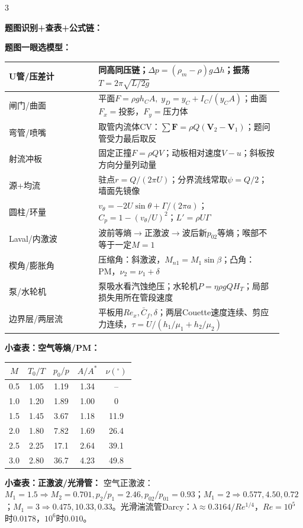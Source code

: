\documentclass[a4paper]{article}
\newcommand{\sect}[1]{\par{\bfseries\color{Q}#1：}}
\begin{document}
\begin{multicols}{3}
{\sect{题图识别+查表+公式链}
\sect{题图一眼选模型}
\renewcommand{\arraystretch}{0.67}\begin{tabular}{|p{0.30\linewidth}|p{0.62\linewidth}|}
\hline U管/压差计 & 同高同压链；$\Delta p=(\rho_m-\rho)g\Delta h$；振荡$T=2\pi\sqrt{L/2g}$\\ \hline
闸门/曲面 & 平面$F=\rho gh_CA,\;y_D=y_C+I_C/(y_CA)$；曲面$F_x=$投影，$F_y=$压力体\\ \hline
弯管/喷嘴 & 取管内流体CV：$\sum\bm F=\rho Q(\bm V_2-\bm V_1)$；题问管受力最后取反\\ \hline
射流冲板 & 固定正撞$F=\rho QV$；动板相对速度$V-u$；斜板按方向分量列动量\\ \hline
源+均流 & 驻点$r=Q/(2\pi U)$；分界流线常取$\psi=Q/2$；墙面先镜像\\ \hline
圆柱/环量 & $v_\theta=-2U\sin\theta+\Gamma/(2\pi a)$；$C_p=1-(v_\theta/U)^2$；$L'=\rho U\Gamma$\\ \hline
Laval/内激波 & 波前等熵$\to$正激波$\to$波后新$p_{02}$等熵；喉部不等于一定$M=1$\\ \hline
楔角/膨胀角 & 压缩角：斜激波，$M_{n1}=M_1\sin\beta$；凸角：PM，$\nu_2=\nu_1+\delta$\\ \hline
泵/水轮机 & 泵吸水看汽蚀绝压；水轮机$P=\eta\rho gQH_T$；局部损失用所在管段速度\\ \hline
边界层/两层流 & 平板用$Re_x,\bar C_f,\delta$；两层Couette速度连续、剪应力连续，$\tau=U/(h_1/\mu_1+h_2/\mu_2)$\\ \hline
\end{tabular}\renewcommand{\arraystretch}{1}

\sect{小查表：空气等熵/PM}
\renewcommand{\arraystretch}{0.66}\begin{tabular}{|c|c|c|c|c|}
\hline $M$&$T_0/T$&$p_0/p$&$A/A^*$&$\nu(^\circ)$\\ \hline
0.5&1.05&1.19&1.34&--\\ \hline
1.0&1.20&1.89&1.00&0\\ \hline
1.5&1.45&3.67&1.18&11.9\\ \hline
2.0&1.80&7.82&1.69&26.4\\ \hline
2.5&2.25&17.1&2.64&39.1\\ \hline
3.0&2.80&36.7&4.23&49.8\\ \hline
\end{tabular}\renewcommand{\arraystretch}{1}

\sect{小查表：正激波/光滑管}
空气正激波：$M_1=1.5\Rightarrow M_2=0.701,p_2/p_1=2.46,p_{02}/p_{01}=0.93$；$M_1=2\Rightarrow0.577,4.50,0.72$；$M_1=3\Rightarrow0.475,10.33,0.33$。光滑湍流管Darcy：$\lambda\approx0.3164/Re^{1/4}$，$Re=10^5$时$0.0178$，$10^6$时$0.010$。

}
\end{multicols}
\end{document}
